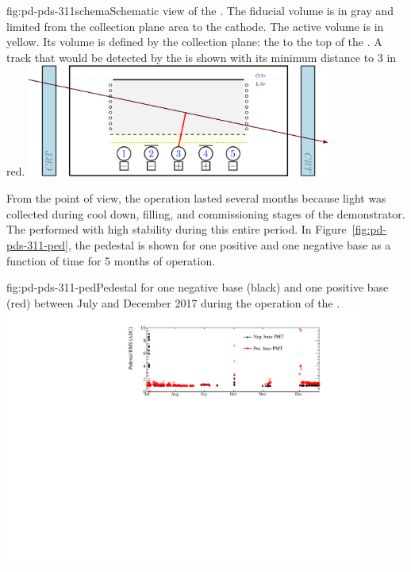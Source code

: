 \begin{dunefigure}{fig:pd-pds-311schema}{Schematic view of the . 
The fiducial volume is in gray and limited from the collection plane area to the cathode. The active volume is in yellow. Its volume is defined by the collection plane: the  to the top of the . A track that would be detected by the  is shown with its minimum distance to  \num{3} in red.}
\includegraphics[width=0.75\textwidth]{graphics/dppd_7_2_v2}
\end{dunefigure}

From the  point of view, the  operation lasted several months because light was collected during cool down, filling, and commissioning stages of the demonstrator.
The  performed with high stability during this entire period. 
In Figure~\ref{fig:pd-pds-311-ped}, the  pedestal  is shown for one positive and one negative base  as a function of time for \num{5} months of operation. 

\begin{dunefigure}{fig:pd-pds-311-ped}{Pedestal  for one negative base  (black) and one positive base  (red) between July and December 2017 during the operation of the .}
\includegraphics[width=0.9\textwidth]{graphics/dppd_311_pedestal_rms.pdf}
\end{dunefigure}

